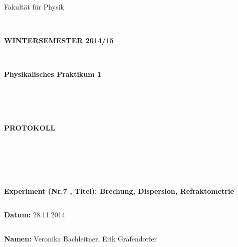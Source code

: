 \documentclass{article}
\begin{document}
\thispagestyle{empty}
			\begin{center}
			\Large{Fakultät für Physik}\\
			\end{center}
\begin{verbatim}


\end{verbatim}
			\begin{center}
			\textbf{\LARGE WINTERSEMESTER 2014/15}
			\end{center}
\begin{verbatim}


\end{verbatim}
			\begin{center}
			\textbf{\LARGE{Physikalisches Praktikum 1}}
			\end{center}
\begin{verbatim}




\end{verbatim}

			\begin{center}
			\textbf{\LARGE{PROTOKOLL}}
			\end{center}
			
\begin{verbatim}





\end{verbatim}

			\begin{flushleft}
			\textbf{\Large{Experiment (Nr.7 , Titel):} Brechung, Dispersion, Refraktometrie}\\
			\LARGE{}	
			\end{flushleft}

\begin{verbatim}

\end{verbatim}	
			\begin{flushleft}
			\textbf{\Large{Datum:}} \Large{28.11.2014}
			\end{flushleft}
			
\begin{verbatim}
\end{verbatim}
		\begin{flushleft}
			\textbf{\Large{Namen:}} \Large{Veronika Bachleitner, Erik Grafendorfer}
			\end{flushleft}
\end{document}
